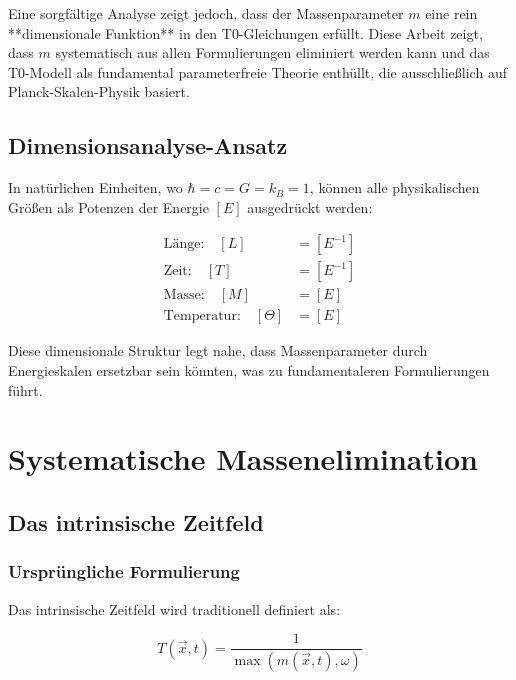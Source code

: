 \documentclass[12pt,a4paper]{article}
\newcommand{\Tfieldt}{T(\vec{x},t)}
\newcommand{\vecx}{\vec{x}}
\begin{document}
	Eine sorgfältige Analyse zeigt jedoch, dass der Massenparameter $m$ eine rein **dimensionale Funktion** in den T0-Gleichungen erfüllt. Diese Arbeit zeigt, dass $m$ systematisch aus allen Formulierungen eliminiert werden kann und das T0-Modell als fundamental parameterfreie Theorie enthüllt, die ausschließlich auf Planck-Skalen-Physik basiert.
	
	\subsection{Dimensionsanalyse-Ansatz}
	\label{subsec:dimensional_approach}
	
	In natürlichen Einheiten, wo $\hbar = c = G = k_B = 1$, können alle physikalischen Größen als Potenzen der Energie $[E]$ ausgedrückt werden:
	
	\begin{align}
		\text{Länge:} \quad [L] &= [E^{-1}] \\
		\text{Zeit:} \quad [T] &= [E^{-1}] \\
		\text{Masse:} \quad [M] &= [E] \\
		\text{Temperatur:} \quad [\Theta] &= [E]
	\end{align}
	
	Diese dimensionale Struktur legt nahe, dass Massenparameter durch Energieskalen ersetzbar sein könnten, was zu fundamentaleren Formulierungen führt.
	
	\section{Systematische Massenelimination}
	\label{sec:mass_elimination}
	
	\subsection{Das intrinsische Zeitfeld}
	\label{subsec:time_field_elimination}
	
	\subsubsection{Ursprüngliche Formulierung}
	
	Das intrinsische Zeitfeld wird traditionell definiert als:
	
	\begin{equation}
		\Tfieldt = \frac{1}{\max(m(\vecx,t), \omega)}
		\label{eq:time_field_original}
	\end{equation}
	
\end{document}
